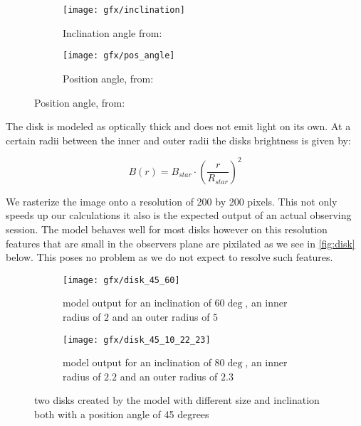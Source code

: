 \begin{figure}[h!]
  \centering
  \begin{subfigure}[b]{0.4\textwidth}
    \texttt{[image: gfx/inclination]}\label{fig:pos_angle}
    \caption{Inclination angle from: \cite{Pieter_Okko}}

  \end{subfigure}
  \begin{subfigure}[b]{0.4\textwidth}
    \texttt{[image: gfx/pos\_angle]}\label{fig:inclination}
    \caption{Position angle, from: \cite{Pieter_Okko}}
  \end{subfigure}
  \label{fig:1}
\end{figure}

The disk is modeled as optically thick and does not emit light on its own. At a certain radii between the inner and outer radii the disks brightness is given by:

\begin{equation}
B(r) = B_{star} \cdot {\left(\frac{r}{R_{star}}\right)}^2
\end{equation}

We rasterize the image onto a resolution of 200 by 200 pixels. This not only speeds up our calculations it also is the expected output of an actual observing session. The model behaves well for most disks however on this resolution features that are small in the observers plane are pixilated as we see in \autoref{fig:disk} below. This poses no problem as we do not expect to resolve such features.

\begin{figure}[h!]
  \begin{subfigure}[b]{0.5\textwidth}
    \texttt{[image: gfx/disk\_45\_60]}
    \caption{model output for an inclination of $60\deg$, an inner radius of $2$ and an outer radius of $5$}
  \end{subfigure}
  \begin{subfigure}[b]{0.5\textwidth}
    \texttt{[image: gfx/disk\_45\_10\_22\_23]}
    \caption{model output for an inclination of $80\deg$, an inner radius of $2.2$ and an outer radius of $2.3$}
  \end{subfigure}
  \caption{two disks created by the model with different size and inclination both with a position angle of 45 degrees}
  \label{fig:disk}
\end{figure}


